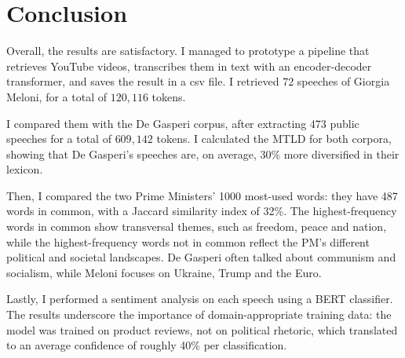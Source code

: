\section{Conclusion}

Overall, the results are satisfactory. I managed to prototype a pipeline that retrieves YouTube videos, transcribes them in text with an encoder-decoder transformer, and saves the result in a csv file. I retrieved 72 speeches of Giorgia Meloni, for a total of $120,116$ tokens.

I compared them with the De Gasperi corpus, after extracting 473 public speeches for a total of $609,142$ tokens. I calculated the MTLD for both corpora, showing that De Gasperi's speeches are, on average, 30\% more diversified in their lexicon.

Then, I compared the two Prime Ministers' 1000 most-used words: they have 487 words in common, with a Jaccard similarity index of 32\%. The highest-frequency words in common show transversal themes, such as freedom, peace and nation, while the highest-frequency words not in common reflect the PM's different political and societal landscapes. De Gasperi often talked about communism and socialism, while Meloni focuses on Ukraine, Trump and the Euro.

Lastly, I performed a sentiment analysis on each speech using a BERT classifier.  The results underscore the importance of domain-appropriate training data: the model was trained on product reviews, not on political rhetoric, which translated to an average confidence of roughly 40\% per classification.